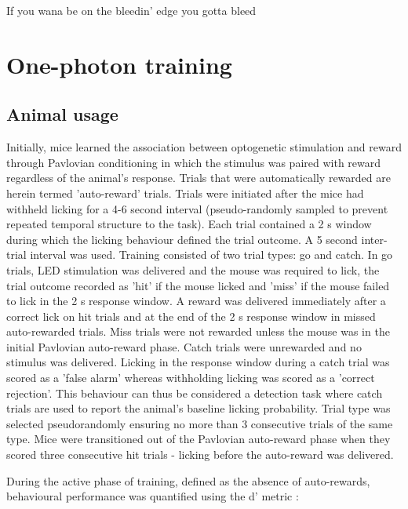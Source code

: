 \begin{savequote}[8cm]

If you wana be on the bleedin' edge you gotta bleed
\end{savequote}

\chapter{\label{ch:3-One-photon_training}One-photon training} 

\minitoc

\section{Animal usage}

Initially, mice learned the association between optogenetic stimulation and reward through Pavlovian conditioning in which the stimulus was paired with reward regardless of the animal's response. Trials that were automatically rewarded are herein termed 'auto-reward' trials. Trials were initiated after the mice had withheld licking for a 4-6 second interval (pseudo-randomly sampled to prevent repeated temporal structure to the task). Each trial contained a 2 s window during which the licking behaviour defined the trial outcome. A 5 second inter-trial interval was used. Training consisted of two trial types: go and catch. In go trials, LED stimulation was delivered and the mouse was required to lick, the trial outcome recorded as 'hit' if the mouse licked and 'miss' if the mouse failed to lick in the 2 s response window. A reward was delivered immediately after a correct lick on hit trials and at the end of the 2 s response window in missed auto-rewarded trials. Miss trials were not rewarded unless the mouse was in the initial Pavlovian auto-reward phase. Catch trials were unrewarded and no stimulus was delivered. Licking in the response window during a catch trial was scored as a 'false alarm' whereas withholding licking was scored as a 'correct rejection'. This behaviour can thus be considered a detection task where catch trials are used to report the animal's baseline licking probability. Trial type was selected pseudorandomly ensuring no more than 3 consecutive trials of the same type. Mice were transitioned out of the Pavlovian auto-reward phase when they scored three consecutive hit trials - licking before the auto-reward was delivered. 

During the active phase  of training, defined as the absence of auto-rewards, behavioural performance was quantified using the d' metric \citep{Brophy1986}:

